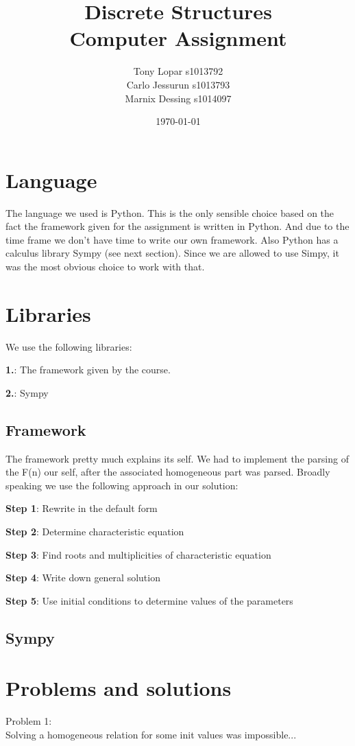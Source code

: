 \documentclass{article}
\begin{document}
\title{Discrete Structures \\ Computer Assignment}
\date{\today}
\author{Tony Lopar s1013792 \\ Carlo Jessurun s1013793 \\ Marnix Dessing s1014097}
\maketitle

\section{Language}
The language we used is Python. This is the only sensible choice based on the fact the framework given for the assignment is written in Python. And due to the time frame we don't have time to write our own framework. Also Python has a calculus library Sympy (see next section). Since we are allowed to use Simpy, it was the most obvious choice to work with that.

\section{Libraries}
We use the following libraries:

\textbf{1.}: The framework given by the course.

\textbf{2.}: Sympy

\subsection{Framework}
The framework pretty much explains its self.
We had to implement the parsing of the F(n) our self, after the associated homogeneous part was parsed. Broadly speaking we use the following approach in our solution:

\textbf{Step 1}: Rewrite in the default form

\textbf{Step 2}: Determine characteristic equation

\textbf{Step 3}: Find roots and multiplicities of characteristic equation

\textbf{Step 4}: Write down general solution

\textbf{Step 5}: Use initial conditions to determine values of the parameters

\newpage
\subsection{Sympy}

\section{Problems and solutions}
Problem 1:\\
Solving a homogeneous relation for some init values was impossible...
\end{document}

